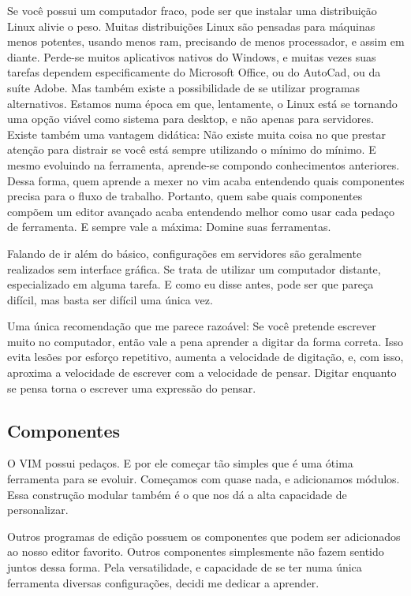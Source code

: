 Se você possui um computador fraco, pode ser que instalar uma distribuição Linux alivie o peso.
Muitas distribuições Linux são pensadas para máquinas menos potentes, usando menos ram, precisando de menos processador, e assim em diante.
Perde-se muitos aplicativos nativos do Windows, e muitas vezes suas tarefas dependem especificamente do Microsoft Office, ou do AutoCad, ou da suíte Adobe.
Mas também existe a possibilidade de se utilizar programas alternativos.
Estamos numa época em que, lentamente, o Linux está se tornando uma opção viável como sistema para desktop, e não apenas para servidores.
Existe também uma vantagem didática:
Não existe muita coisa no que prestar atenção para distrair se você está sempre utilizando o mínimo do mínimo.
E mesmo evoluindo na ferramenta, aprende-se compondo conhecimentos anteriores.
Dessa forma, quem aprende a mexer no vim acaba entendendo quais componentes precisa para o fluxo de trabalho.
Portanto, quem sabe quais componentes compõem um editor avançado acaba entendendo melhor como usar cada pedaço de ferramenta.
E sempre vale a máxima: Domine suas ferramentas.

Falando de ir além do básico, configurações em servidores são geralmente realizados sem interface gráfica.
Se trata de utilizar um computador distante, especializado em alguma tarefa.
E como eu disse antes, pode ser que pareça difícil, mas basta ser difícil uma única vez.

Uma única recomendação que me parece razoável: Se você pretende escrever muito no computador, então vale a pena
aprender a digitar da forma correta.
Isso evita lesões por esforço repetitivo, aumenta a velocidade de digitação,
e, com isso, aproxima a velocidade de escrever com a velocidade de pensar.
Digitar enquanto se pensa torna o escrever uma expressão do pensar.

\subsection{Componentes}
O VIM possui pedaços.
E por ele começar tão simples que é uma ótima ferramenta para se evoluir.
Começamos com quase nada, e adicionamos módulos.
Essa construção modular também é o que nos dá a alta capacidade de personalizar.

Outros programas de edição possuem os componentes que podem ser adicionados ao nosso editor favorito.
Outros componentes simplesmente não fazem sentido juntos dessa forma.
Pela versatilidade, e capacidade de se ter numa única ferramenta diversas configurações, decidi me dedicar a aprender.

